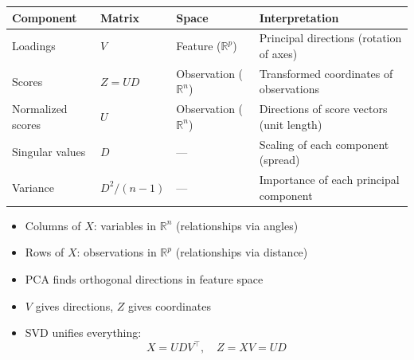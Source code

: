 \documentclass[
  letterpaper,
  DIV=11,
  numbers=noendperiod]{scrreprt}
\newcounter{none} %
\providecommand{\tightlist}{%
  \setlength{\itemsep}{0pt}\setlength{\parskip}{0pt}}
\theoremstyle{definition}
\theoremstyle{definition}
\theoremstyle{plain}
\theoremstyle{plain}
\theoremstyle{remark}
\begin{document}
{\def\LTcaptype{none} %
\begin{longtable}[]{@{}
  >{\raggedright\arraybackslash}p{}
  >{\raggedright\arraybackslash}p{}
  >{\raggedright\arraybackslash}p{}
  >{\raggedright\arraybackslash}p{}@{}}
\toprule\noalign{}
\begin{minipage}[b]{\linewidth}\raggedright
Component
\end{minipage} & \begin{minipage}[b]{\linewidth}\raggedright
Matrix
\end{minipage} & \begin{minipage}[b]{\linewidth}\raggedright
Space
\end{minipage} & \begin{minipage}[b]{\linewidth}\raggedright
Interpretation
\end{minipage} \\
\midrule\noalign{}
\endhead
\bottomrule\noalign{}
\endlastfoot
Loadings & \(V\) & Feature (\(\mathbb{R}^p\)) & Principal directions
(rotation of axes) \\
Scores & \(Z = UD\) & Observation (\(\mathbb{R}^n\)) & Transformed
coordinates of observations \\
Normalized scores & \(U\) & Observation (\(\mathbb{R}^n\)) & Directions
of score vectors (unit length) \\
Singular values & \(D\) & --- & Scaling of each component (spread) \\
Variance & \(D^2/(n-1)\) & --- & Importance of each principal
component \\
\end{longtable}
}

\begin{itemize}
\tightlist
\item
  Columns of \(X\): variables in \(\mathbb{R}^n\) (relationships via
  angles)
\item
  Rows of \(X\): observations in \(\mathbb{R}^p\) (relationships via
  distance)
\item
  PCA finds orthogonal directions in feature space
\item
  \(V\) gives directions, \(Z\) gives coordinates
\item
  SVD unifies everything: \[
  X = UDV^\top, \quad Z = XV = UD
  \]
\end{itemize}
\end{document}
